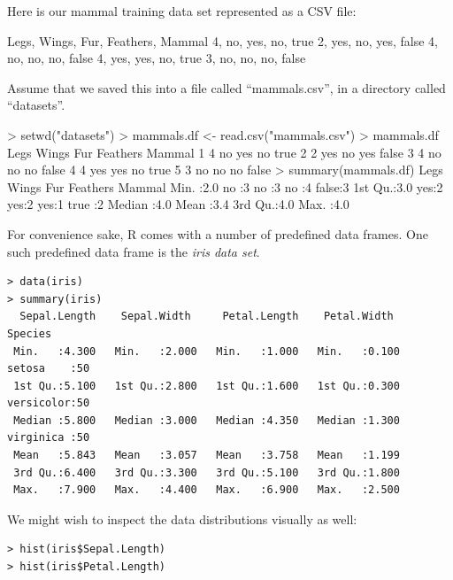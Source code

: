 \documentclass[a4paper,blends,pdf,colorBG,slideColor]{prosper}
\begin{document}
Here is our mammal training data set represented as a CSV file:

\begin{Rcode}
Legs, Wings, Fur, Feathers, Mammal
4, no, yes, no, true
2, yes, no, yes, false
4, no, no, no, false
4, yes, yes, no, true
3, no, no, no, false
\end{Rcode}

Assume that we saved this into a file called ``mammals.csv'', in a directory called ``datasets''.
\es

 \begin{Rcode}
> setwd("datasets")
> mammals.df <- read.csv("mammals.csv")
> mammals.df
  Legs Wings  Fur Feathers Mammal
1    4    no  yes       no   true
2    2   yes   no      yes  false
3    4    no   no       no  false
4    4   yes  yes       no   true
5    3    no   no       no  false
> summary(mammals.df)
      Legs      Wings     Fur    Feathers    Mammal 
 Min.   :2.0    no :3    no :3    no :4    false:3  
 1st Qu.:3.0    yes:2    yes:2    yes:1    true :2  
 Median :4.0                                        
 Mean   :3.4                                        
 3rd Qu.:4.0                                        
 Max.   :4.0                                        
 \end{Rcode}
\es

For convenience sake, R comes with a number of predefined data frames.  One such
predefined data frame is the {\em iris data set}.
{\scriptsize
\begin{center}
\begin{minipage}[t]{5in}
\begin{verbatim}
> data(iris)
> summary(iris)
  Sepal.Length    Sepal.Width     Petal.Length    Petal.Width          Species  
 Min.   :4.300   Min.   :2.000   Min.   :1.000   Min.   :0.100   setosa    :50  
 1st Qu.:5.100   1st Qu.:2.800   1st Qu.:1.600   1st Qu.:0.300   versicolor:50  
 Median :5.800   Median :3.000   Median :4.350   Median :1.300   virginica :50  
 Mean   :5.843   Mean   :3.057   Mean   :3.758   Mean   :1.199                  
 3rd Qu.:6.400   3rd Qu.:3.300   3rd Qu.:5.100   3rd Qu.:1.800                  
 Max.   :7.900   Max.   :4.400   Max.   :6.900   Max.   :2.500    
\end{verbatim}
\end{minipage}
\end{center}
}

\vspace{.2in}
We might wish to inspect the data distributions visually as well:
\begin{verbatim}
> hist(iris$Sepal.Length)
> hist(iris$Petal.Length)
\end{verbatim}
\es
\end{document}
